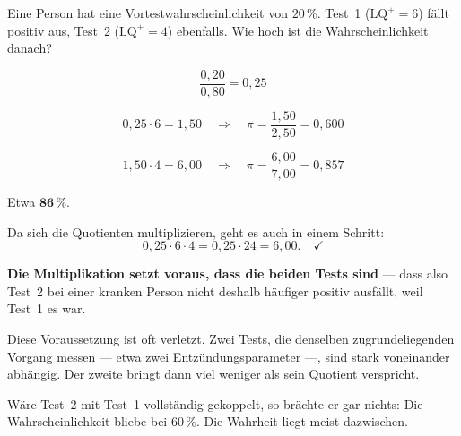 \begin{aufgabe}
Eine Person hat eine Vortestwahrscheinlichkeit von $20\,\%$. Test~1 ($\mathrm{LQ}^{+} = 6$) fällt positiv aus, Test~2 ($\mathrm{LQ}^{+} = 4$) ebenfalls. Wie hoch ist die Wahrscheinlichkeit danach?

\loesung
{}
\[ \frac{0{,}20}{0{,}80} = 0{,}25 \]

\[ 0{,}25 \cdot 6 = 1{,}50 \quad\Longrightarrow\quad \pi = \frac{1{,}50}{2{,}50} = 0{,}600 \]

\[ 1{,}50 \cdot 4 = 6{,}00 \quad\Longrightarrow\quad \pi = \frac{6{,}00}{7{,}00} = 0{,}857 \]

Etwa $\mathbf{86\,\%}$.

Da sich die Quotienten multiplizieren, geht es auch in einem Schritt:
\[ 0{,}25 \cdot 6 \cdot 4 = 0{,}25 \cdot 24 = 6{,}00 . \quad \checkmark \]

\begin{center}
\begin{minipage}{0.9\textwidth}
\textbf{Die Multiplikation setzt voraus, dass die beiden Tests  sind} --- dass also Test~2 bei einer kranken Person nicht deshalb häufiger positiv ausfällt, weil Test~1 es war.
\end{minipage}
\end{center}

Diese Voraussetzung ist oft verletzt. Zwei Tests, die denselben zugrundeliegenden Vorgang messen --- etwa zwei Entzündungsparameter ---, sind stark voneinander abhängig. Der zweite bringt dann viel weniger als sein Quotient verspricht.

\begin{center}
\begin{minipage}{0.86\textwidth}
\end{minipage}
\end{center}

Wäre Test~2 mit Test~1 vollständig gekoppelt, so brächte er gar nichts: Die Wahrscheinlichkeit bliebe bei $60\,\%$. Die Wahrheit liegt meist dazwischen.
\end{aufgabe}

